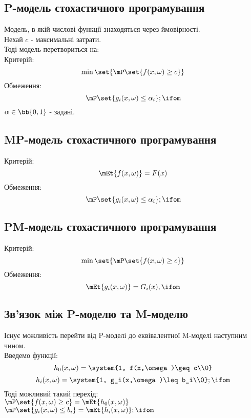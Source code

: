 \subsection{P-модель стохастичного програмування}
Модель, в якій числові функції знаходяться через ймовірності.\\
Нехай $c$ - максимальні затрати.\\
Тоді модель перетвориться на:\\
Критерій:
\begin{equation}
\min\set{\mP\set{f(x,\omega)\geq c}}
\end{equation}
Обмеження:
\begin{equation}
\mP\set{g_i(x,\omega)\leq \alpha_i};\ifom
\end{equation}
$\alpha\in\bb{0,1}$ - задані.
\subsection{MP-модель стохастичного програмування}
Критерій:
\begin{equation}
\mEt{f(x,\omega)}=F(x)
\end{equation}
Обмеження:
\begin{equation}
\mP\set{g_i(x,\omega)\leq \alpha_i};\ifom
\end{equation}
\subsection{PM-модель стохастичного програмування}
Критерій:
\begin{equation}
\min\set{\mP\set{f(x,\omega)\geq c}}
\end{equation}
Обмеження:
\begin{equation}
\mEt{g_i(x,\omega)}=G_i(x),\ifom
\end{equation}
\subsection{Зв’язок між P-моделю та M-моделю}
Існує можливість перейти від P-моделі до еквівалентної M-моделі наступним чином.\\
Введемо функції:
\begin{equation}
h_0(x,\omega)=\system{1, f(x,\omega)\geq c\\0}
\end{equation}
\begin{equation}
h_i(x,\omega)=\system{1, g_i(x,\omega)\leq b_i\\0};\ifom
\end{equation}
Тоді можливий такий перехід:\\
$\mP\set{f(x,\omega)\geq c}=\mEt{h_0(x,\omega)}$\\
$\mP\set{g_i(x,\omega)\leq b_i} = \mEt{h_i(x,\omega)};\ifom$
